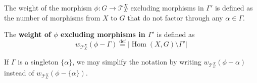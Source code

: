 The weight of the morphism \( \phi : G \to \mathcal{T}_\Sigma^X\) excluding morphisms in \( \Gamma' \) is defined as the number of morphisms from \( X \) to \( G \) that do not factor through any \( \alpha \in \Gamma \).

\begin{definition}
    \label{def:weight_excluding}
    The \textbf{weight of \( \phi \) excluding morphisms in \( \Gamma' \)} is defined as
    \[
        w_{\mathcal{T}_\Sigma^X}(\phi - \Gamma) \overset{\operatorname{def}}{=} \left| \operatorname{Hom}(X, G) \setminus \Gamma' \right|
    \]
\end{definition}

\begin{remark}
    If \( \Gamma \) is a singleton \( \{ \alpha \} \), we may simplify the notation by writing \( w_{\mathcal{T}_\Sigma^X}(\phi - \alpha) \) instead of \( w_{\mathcal{T}_\Sigma^X}(\phi - \{ \alpha \}) \).
\end{remark}
